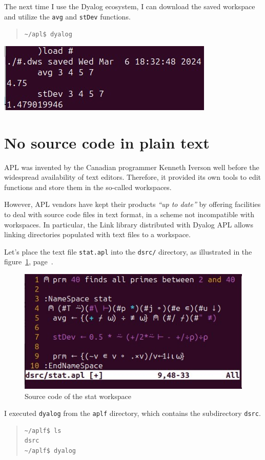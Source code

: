 \documentclass[a4paper,12pt]{book}
\begin{document}
The next time I use the Dyalog ecosystem,
I can download the saved workspace and
utilize the \verb|avg| and \verb|stDev| functions.
\begin{quote}
  \verb|~/apl$ dyalog|
\end{quote}
\includegraphics{figs/loadws.jpg}

\section{No source code in plain text}
APL was invented by the Canadian programmer Kenneth
Iverson well before the widespread availability
of text editors. Therefore, it provided its own
tools to edit functions and store them in the
so-called workspaces.

However, APL vendors have kept their
products {\em ``up to date''} by offering facilities
to deal with source code files in text format,
in a scheme not incompatible with workspaces.
In particular, the Link library distributed
with Dyalog APL allows linking directories
populated with text files to a workspace.

Let's place the text file \verb|stat.apl|
into the \verb|dsrc/| directory, as illustrated
in the figure~\ref{fig:stat}, page~\pageref{fig:stat}.

\begin{figure}[!h]
\includegraphics{figs/dsrc.jpg}
\caption{Source code of the stat workspace}
\label{fig:stat}
\end{figure}

I executed \verb|dyalog| from the \verb|aplf|
directory, which contains the subdirectory \verb|dsrc|.
\begin{quote}
\begin{verbatim}
~/aplf$ ls
dsrc
~/aplf$ dyalog
\end{verbatim}
\end{quote}
\end{document}

